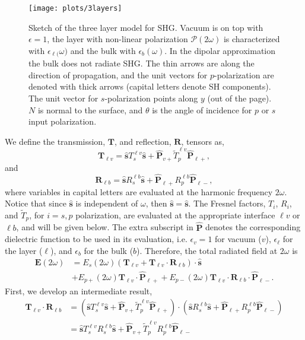 \documentclass{article}
\begin{document}
\begin{figure}[t]
\centering
\texttt{[image: plots/3layers]}
\caption{Sketch of the three layer model for SHG. Vacuum is on top with
$\epsilon=1$, the layer with non-linear polarization
$\boldsymbol{\mathcal{P}}(2\omega)$ is characterized with
$\epsilon_{\ell(}\omega)$ and the bulk with $\epsilon_{b}(\omega)$. In the
dipolar approximation the bulk does not radiate SHG. The thin arrows are along
the direction of propagation, and the unit vectors for $p$-polarization are
denoted with thick arrows (capital letters denote SH components). The unit
vector for $s$-polarization points along $y$ (out of the page). $N$ is normal
to the surface, and $\theta$ is the angle of incidence for $p$ or $s$ input
polarization.\label{3layers}}
\end{figure}

We define the transmission, $\mathbf{T}$, and reflection, $\mathbf{R}$, tensors as,
\begin{equation}\label{r5}
\mathbf{T}_{\ell v}= \hat{\mathbf{s}}T_{s}^{\ell v}\hat{\mathbf{s}} + \hat{\mathbf{P}}_{v+}\tilde{T}_{p}^{\ell v} \hat{\mathbf{P}}_{\ell +},
\end{equation}
and
\begin{equation}\label{r6}
\mathbf{R}_{\ell b}= \hat{\mathbf{s}}R_{s}^{\ell b}\hat{\mathbf{s}} + \hat{\mathbf{P}}_{\ell +}R_{p}^{\ell b} \hat{\mathbf{P}}_{\ell -},
\end{equation}
where variables in capital letters are evaluated at the harmonic frequency
$2\omega$. Notice that since $\hat{\mathbf{s}}$ is independent of $\omega$, then
$\hat{\mathbf{s}}=\hat{\mathbf{s}}$. The Fresnel factors, $T_{i}$, $R_{i}$,
and $\tilde{T}_{p}$, for $i=s,p$ polarization, are evaluated at the appropriate
interface $\ell v$ or $\ell b$, and will be given below. The extra subscript
in $\hat{\mathbf{P}}$ denotes the corresponding dielectric function to be used in its
evaluation, i.e. $\epsilon_{v}=1$ for vacuum ($v$),
$\epsilon_{\ell}$ for the layer ($\ell$),
and $\epsilon_{b}$ for the bulk ($b$).
Therefore, the total radiated field at $2\omega$ is
\begin{align}\label{r7}
\mathbf{E}(2\omega) &=
E_{s}(2\omega)\left(\mathbf{T}_{\ell v} + \mathbf{T}_{\ell v}\cdot\mathbf{R}_{\ell b}\right)\cdot\hat{\mathbf{s}}\nonumber\\ 
&+ E_{p+}(2\omega)\mathbf{T}_{\ell v}\cdot\hat{\mathbf{P}}_{\ell +} + E_{p-}(2\omega)\mathbf{T}_{\ell v}\cdot\mathbf{R}_{\ell b}\cdot\hat{\mathbf{P}}_{\ell -}.
\end{align}
First, we develop an intermediate result,
\begin{align*}
\mathbf{T}_{\ell v}\cdot\mathbf{R}_{\ell b} &= (\hat{\mathbf{s}}T_{s}^{\ell v}\hat{\mathbf{s}} + \hat{\mathbf{P}}_{v+}\tilde{T}_{p}^{\ell v} \hat{\mathbf{P}}_{\ell +})\cdot(\hat{\mathbf{s}}R_{s}^{\ell b}\hat{\mathbf{s}} + \hat{\mathbf{P}}_{\ell +}R_{p}^{\ell b} \hat{\mathbf{P}}_{\ell -})\\
&= \hat{\mathbf{s}}T_{s}^{\ell v}R_{s}^{\ell b}\hat{\mathbf{s}} + \hat{\mathbf{P}}_{v+}\tilde{T}_{p}^{\ell v}R_{p}^{\ell b}\hat{\mathbf{P}}_{\ell -}
\end{align*}
\end{document}
